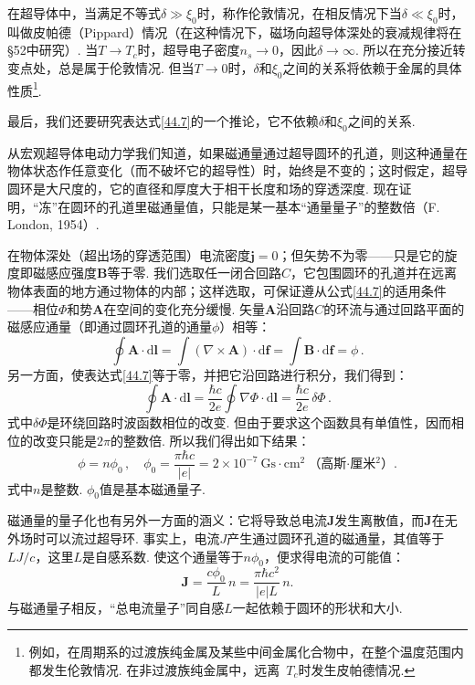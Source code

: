 在超导体中，当满足不等式$\delta\gg\xi_0$时，称作伦敦情况，在相反情况下当$\delta\ll\xi_0$时，叫做皮帕德（Pippard）情况（在这种情况下，磁场向超导体深处的衰减规律将在§52中研究）. 当$T\to T_c$时，超导电子密度$n_s\to0$，因此$\delta\to\infty$. 所以在充分接近转变点处，总是属于伦敦情况. 但当$T\to0$时，$\delta$和$\xi_0$之间的关系将依赖于金属的具体性质\footnote{例如，在周期系的过渡族纯金属及某些中间金属化合物中，在整个温度范围内都发生伦敦情况. 在非过渡族纯金属中，远离~$T_c$时发生皮帕德情况.}.

最后，我们还要研究表达式\eqref{44.7}的一个推论，它不依赖$\delta$和$\xi_0$之间的关系.

从宏观超导体电动力学我们知道，如果磁通量通过超导圆环的孔道，则这种通量在物体状态作任意变化（而不破坏它的超导性）时，始终是不变的；这时假定，超导圆环是大尺度的，它的直径和厚度大于相干长度和场的穿透深度. 现在证明，“冻”在圆环的孔道里磁通量值，只能是某一基本“通量量子”的整数倍（F.\,London, 1954）.

在物体深处（超出场的穿透范围）电流密度$\bm j=0$；但矢势不为零——只是它的旋度即磁感应强度$\bm B$等于零. 我们选取任一闭合回路$C$，它包围圆环的孔道并在远离物体表面的地方通过物体的内部；这样选取，可保证遵从公式\eqref{44.7}的适用条件——相位$\Phi$和势$\bm A$在空间的变化充分缓慢. 矢量$\bm A$沿回路$C$的环流与通过回路平面的磁感应通量（即通过圆环孔道的通量$\phi$）相等：
\begin{equation*}
\oint\bm A\cdot\mathrm d\bm l = \int(\nabla\times\bm A)\cdot\mathrm d\bm f = \int\bm B\cdot\mathrm d\bm f = \phi\,.
\end{equation*}
另一方面，使表达式\eqref{44.7}等于零，并把它沿回路进行积分，我们得到：
\begin{equation*}
\oint\bm A\cdot\mathrm d\bm l = \frac{\hbar c}{2e}\oint\nabla\Phi\cdot\mathrm d\bm l = \frac{\hbar c}{2e}\,\delta\Phi\,.
\end{equation*}
式中$\delta\Phi$是环绕回路时波函数相位的改变. 但由于要求这个函数具有单值性，因而相位的改变只能是$2\pi$的整数倍. 所以我们得出如下结果：
\begin{equation}
\phi = n\phi_0\,,\quad \phi_0 = \frac{\pi\hbar c}{|e|} = 2\times10^{-7}\ \mathrm{Gs}\cdot\mathrm{cm}^2\ \text{（高斯·厘米$^{2}$）}.
\label{44.15}
\end{equation}
式中$n$是整数. $\phi_0$值是基本磁通量子.

磁通量的量子化也有另外一方面的涵义：它将导致总电流$\bm J$发生离散值，而$\bm J$在无外场时可以流过超导环. 事实上，电流$J$产生通过圆环孔道的磁通量，其值等于$LJ/c$，这里$L$是自感系数. 使这个通量等于$n\phi_0$，便求得电流的可能值：
\begin{equation}
\bm J = \frac{c\phi_0}{L}\,n = \frac{\pi\hbar c^2}{|e|L}\,n.
\label{44.16}
\end{equation}
与磁通量子相反，“总电流量子”同自感$L$一起依赖于圆环的形状和大小.

